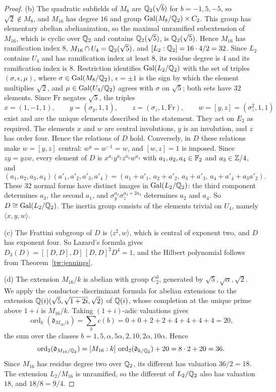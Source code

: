 \begin{proof}
(b) The quadratic subfields of $M_8$ are $\mathbb Q_2(\sqrt b)$ for $b=-1,5,-5$, so
$\sqrt2\notin M_8$, and $M_{16}$ has degree $16$ and group
$\operatorname{Gal}(M_8/\mathbb Q_2)\times C_2$. This group has elementary abelian
abelianization, so the maximal unramified subextension of $M_{16}$, which is
cyclic over $\mathbb Q_2$ and contains $\mathbb Q_2(\sqrt5)$, is $\mathbb Q_2(\sqrt5)$. Hence
$M_{16}$ has ramification index $8$, $M_{16}\cap U_4=\mathbb Q_2(\sqrt5)$, and
$[L_2:\mathbb Q_2]=16\cdot4/2=32$. Since $L_2$ contains $U_4$ and has ramification
index at least $8$, its residue degree is $4$ and its ramification index is
$8$. Restriction identifies $\operatorname{Gal}(L_2/\mathbb Q_2)$ with the set of triples
$(\sigma,\epsilon,\mu)$, where $\sigma\in\operatorname{Gal}(M_8/\mathbb Q_2)$, $\epsilon=\pm1$ is
the sign by which the element multiplies $\sqrt2$, and $\mu\in\operatorname{Gal}(U_4/\mathbb Q_2)$
agrees with $\sigma$ on $\sqrt5$; both sets have $32$ elements. Since $\mathrm{Fr}$
negates $\sqrt5$, the triples
\[
 x=(1,-1,1),\qquad y=(\sigma_y,1,1),\qquad z=(\sigma_z,1,\mathrm{Fr}),\qquad
 w=[y,z]=(\sigma_z^2,1,1)
\]
exist and are the unique elements described in the statement. They act on
$E_2$ as required. The elements $x$ and $w$ are central involutions, $y$ is
an involution, and $z$ has order four. Hence the relations of $D$ hold. Conversely, in
$D$ these relations make $w=[y,z]$ central: $w^y=w^{-1}=w$, and $[w,z]=1$ is
imposed. Since $zy=yzw$, every element of $D$ is
$x^{a_1}y^{a_2}z^{a_3}w^{a_4}$ with $a_1,a_2,a_4\in\mathbb F_2$ and
$a_3\in\mathbb Z/4$, and
\[
 (a_1,a_2,a_3,a_4)(a'_1,a'_2,a'_3,a'_4)
 =(a_1+a'_1,\,a_2+a'_2,\,a_3+a'_3,\,a_4+a'_4+a_3a'_2).
\]
These $32$ normal forms have distinct images in $\operatorname{Gal}(L_2/\mathbb Q_2)$: the third
component determines $a_3$, the second $a_1$, and
$\sigma_y^{a_2}\sigma_z^{a_3+2a_4}$ determines $a_2$ and $a_4$. So
$D\cong\operatorname{Gal}(L_2/\mathbb Q_2)$. The inertia group consists of the elements trivial
on $U_4$, namely $\langle x,y,w\rangle$.

(c) The Frattini subgroup of $D$ is $\langle z^2,w\rangle$, which is central
of exponent two, and $D$ has exponent four. So Lazard's formula gives
$D_3(D)=[[D,D],D]\,[D,D]^2D^4=1$, and the Hilbert polynomial follows from
Theorem~\ref{tw:jennings}.

(d) The extension $M_{16}/k$ is abelian with group $C_2^3$, generated by
$\sqrt5,\sqrt\alpha,\sqrt2$. We apply the conductor--discriminant formula for
abelian extensions \cite[Chapter~V, Theorem~3.27]{MilneCFT} to the extension
$\mathbb Q(i)(\sqrt5,\sqrt{1+2i},\sqrt2)$ of $\mathbb Q(i)$, whose completion at the unique
prime above $1+i$ is $M_{16}/k$. Taking $(1+i)$-adic valuations gives
\[
 \operatorname{ord}_k(\mathfrak d_{M_{16}/k})=\sum_bc(b)=0+0+2+2+4+4+4+4=20,
\]
the sum over the classes $b=1,5,\alpha,5\alpha,2,10,2\alpha,10\alpha$. Hence
\[
 \operatorname{ord}_2(\mathfrak d_{M_{16}/\mathbb Q_2})
 =[M_{16}:k]\,\operatorname{ord}_2(\mathfrak d_{k/\mathbb Q_2})+20=8\cdot2+20=36.
\]
Since $M_{16}$ has residue degree two over $\mathbb Q_2$, its different has
valuation $36/2=18$. The extension $L_2/M_{16}$ is unramified, so the
different of $L_2/\mathbb Q_2$ also has valuation $18$, and $18/8=9/4$.
\end{proof}

